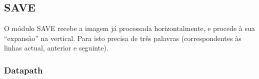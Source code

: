 \documentclass[a4paper]{article}
\begin{document}

\subsection{SAVE}

O módulo SAVE recebe a imagem já processada horizontalmente, e procede à sua ``expansão'' na vertical. Para isto precisa de três palavras (correspondentes às linhas actual, anterior e seguinte).

\subsubsection{Datapath}
\end{document}
